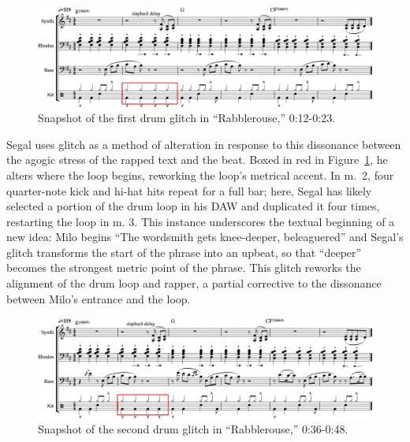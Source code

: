     \begin{figure}[ht]
        \centering
        \includegraphics[width=\textwidth]{images/figures/chp 02/012023rabblefirstglitch.pdf}
        \caption{Snapshot of the first drum glitch in ``Rabblerouse,'' 0:12-0:23.}
        \label{fig:rabblefirstglitch}
    \end{figure}

Segal uses glitch as a method of alteration in response to this dissonance between the agogic
stress of the rapped text and the beat. Boxed in red in Figure~\ref{fig:rabblefirstglitch}, 
he alters where the loop begins, reworking the loop's metrical accent. In m.~2, four quarter-note
kick and hi-hat hits repeat for a full bar; here, Segal has likely selected a portion of the drum
loop in his DAW and duplicated it four times, restarting the loop in m. 3. This instance underscores
the textual beginning of a new idea: Milo begins ``The wordsmith gets knee-deeper, beleaguered'' and
Segal's glitch transforms the start of the phrase into an upbeat, so that ``deeper'' becomes the 
strongest metric point of the phrase. This glitch reworks the alignment of the drum loop and rapper,
a partial corrective to the dissonance between Milo's entrance and the loop.

    \begin{figure}[ht]
        \centering
        \includegraphics[width=\textwidth]{images/figures/chp 02/036048rabblesecondglitch.pdf}
        \caption{Snapshot of the second drum glitch in ``Rabblerouse,'' 0:36-0:48.}
        \label{fig:rabblesecondglitch}
    \end{figure}

